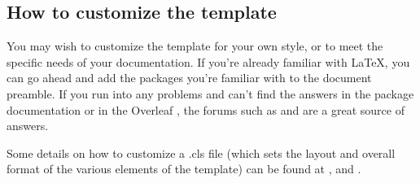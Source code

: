 \subsection{How to customize the template}

You may wish to customize the template for your own style, or to meet the specific needs of your documentation. If you're already familiar with LaTeX,  you can go ahead and add the packages you're familiar with to the document preamble. If you run into any problems and can't find the answers in the package documentation or in the Overleaf , the forums such as  and  are a great source of answers.

Some details on how to customize a .cls file (which sets the layout and overall format of the various elements of the template) can be found at , and . 